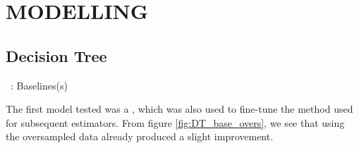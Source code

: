 \section{MODELLING}
\begin{frame}{\secname}
\end{frame}

\subsection{Decision Tree}

\begin{frame}{\subsecname\ : Baselines(s)}

The first model tested was a , which was also used to fine-tune the method used for subsequent estimators. From figure \ref{fig:DT_base_overs}, we see that using the oversampled data already produced a slight improvement.


\end{frame}
